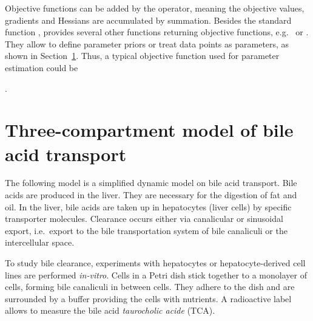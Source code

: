 \documentclass[article]{jss}
\begin{document}
Objective functions can be added by the  operator, meaning the objective values, gradients and Hessians are accumulated by summation. Besides the standard function ,  provides several other functions returning objective functions, e.g.~ or . They allow to define parameter priors or treat data points as parameters, as shown in Section~\ref{sec:example}. Thus, a typical objective function used for parameter estimation could be
\begin{center}
	.
\end{center}


\section{Three-compartment model of bile acid transport}
\label{sec:example}

The following model is a simplified dynamic model on bile acid transport. Bile acids are produced in the liver. They are necessary for the digestion of fat and oil. In the liver, bile acids are taken up in hepatocytes (liver cells) by specific transporter molecules. Clearance occurs either via canalicular or sinusoidal export, i.e.~export to the bile transportation system of bile canaliculi or the intercellular space.

To study bile clearance, experiments with hepatocytes or hepatocyte-derived cell lines are performed \textit{in-vitro}. Cells in a Petri dish stick together to a monolayer of cells, forming bile canaliculi in between cells. They adhere to the dish and are surrounded by a buffer providing the cells with nutrients. A radioactive label allows to measure the bile acid \textit{taurocholic acide} (TCA).
\end{document}
